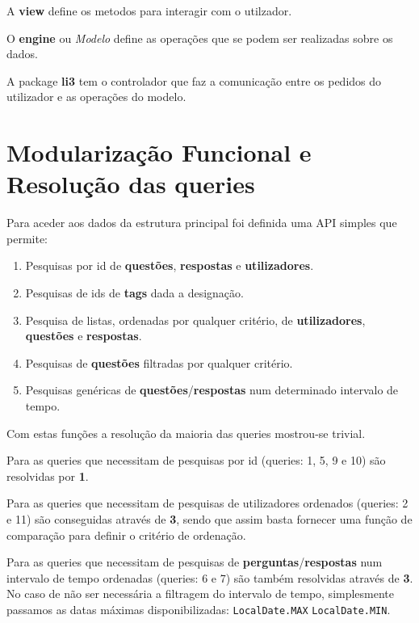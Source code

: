 \documentclass[10pt,a4paper]{report}
\begin{document}
    A \textbf{view} define os metodos para interagir com o utilzador.

    O \textbf{engine} ou \textit{Modelo} define as operações que se podem
    ser realizadas sobre os dados.
    
    A package \textbf{li3} tem o controlador que faz a comunicação entre os
    pedidos do utilizador e as operações do modelo.

\chapter{Modularização Funcional e Resolução das queries}
    Para aceder aos dados da estrutura principal foi definida uma API
    simples que permite:
    \begin{enumerate}[1.]
        \item Pesquisas por id de \textbf{questões}, \textbf{respostas} e
        \textbf{utilizadores}.
        \item Pesquisas de ids de \textbf{tags} dada a designação.
        \item Pesquisa de listas, ordenadas por qualquer critério, de
        \textbf{utilizadores}, \textbf{questões} e \textbf{respostas}.
        \item Pesquisas de \textbf{questões} filtradas por qualquer critério.
        \item Pesquisas genéricas de \textbf{questões}/\textbf{respostas}
        num determinado intervalo de tempo.
    \end{enumerate}

    Com estas funções a resolução da maioria das queries mostrou-se
    trivial.

    Para as queries que necessitam de pesquisas por id (queries: 1, 5, 9 e 10)
    são resolvidas por \textbf{1}.

    Para as queries que necessitam de pesquisas de utilizadores ordenados
    (queries: 2 e 11) são conseguidas através de \textbf{3}, sendo que assim
    basta fornecer uma função de comparação para definir o critério de
    ordenação.

    Para as queries que necessitam de pesquisas de
    \textbf{perguntas}/\textbf{respostas} num intervalo de tempo ordenadas
    (queries: 6 e 7) são também resolvidas através de \textbf{3}. No caso de não
    ser necessária a filtragem do intervalo de tempo, simplesmente passamos as
    datas máximas disponibilizadas: \texttt{LocalDate.MAX}
    \texttt{LocalDate.MIN}.
\end{document}
